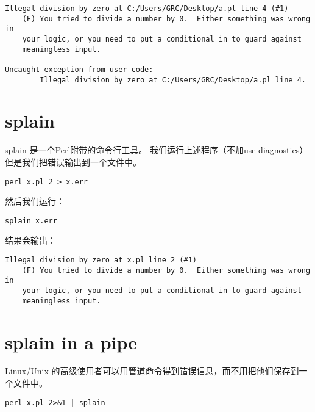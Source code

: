 \documentclass{ctexart}
\begin{document}
\begin{verbatim}
Illegal division by zero at C:/Users/GRC/Desktop/a.pl line 4 (#1)
    (F) You tried to divide a number by 0.  Either something was wrong in
    your logic, or you need to put a conditional in to guard against
    meaningless input.

Uncaught exception from user code:
        Illegal division by zero at C:/Users/GRC/Desktop/a.pl line 4.
\end{verbatim}
\section{splain}
\label{sec-3}

splain 是一个Perl附带的命令行工具。
我们运行上述程序（不加use diagnostics）但是我们把错误输出到一个文件中。

\begin{lstlisting}
perl x.pl 2 > x.err
\end{lstlisting}
然后我们运行：

\begin{lstlisting}
splain x.err
\end{lstlisting}
结果会输出：

\begin{verbatim}
Illegal division by zero at x.pl line 2 (#1)
    (F) You tried to divide a number by 0.  Either something was wrong in
    your logic, or you need to put a conditional in to guard against
    meaningless input.
\end{verbatim}
\section{splain in a pipe}
\label{sec-4}

Linux/Unix 的高级使用者可以用管道命令得到错误信息，而不用把他们保存到一个文件中。

\begin{lstlisting}
perl x.pl 2>&1 | splain
\end{lstlisting}
\end{document}
